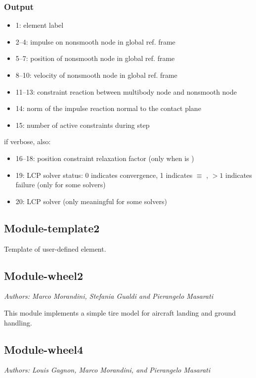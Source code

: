 \subsubsection{Output}
\begin{itemize}
\item 1: element label
\item 2--4:   impulse on nonsmooth node in global ref. frame
\item 5--7:   position of nonsmooth node in global ref. frame
\item 8--10:  velocity of nonsmooth node in global ref. frame
\item 11--13: constraint reaction between multibody node and nonsmooth node
\item 14:    norm of the impulse reaction normal to the contact plane
\item 15:    number of active constraints during step
\end{itemize}
if verbose, also:
\begin{itemize}
\item 16--18: position constraint relaxation factor
	(only when  is )
\item 19:    LCP solver status:
	0 indicates convergence,
	1 indicates  $\equiv$ ,
	$>1$ indicates failure
(only for some solvers)
\item 20:    LCP solver 
(only meaningful for some solvers)
\end{itemize}


\subsection{Module-template2}
Template of user-defined element.

\subsection{Module-wheel2}
\emph{Authors: Marco Morandini, Stefania Gualdi and Pierangelo Masarati}

\noindent
This module implements a simple tire model for aircraft landing and ground handling.


\subsection{Module-wheel4}
\emph{Authors: Louis Gagnon, Marco Morandini, and Pierangelo Masarati}

